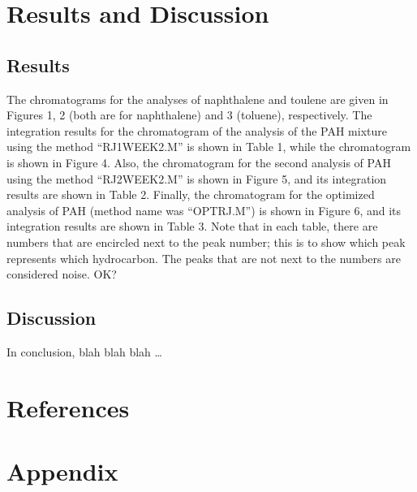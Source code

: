 \documentclass[a4paper, 12pt]{article}
\begin{document}

\section{Results and Discussion}

\subsection{Results}
The chromatograms for the analyses of naphthalene and toulene are given in Figures 1, 2 (both are for naphthalene) and 3 (toluene), respectively. The integration results for the chromatogram of the analysis of the PAH mixture using the method ``RJ1WEEK2.M'' is shown in Table 1, while the chromatogram is shown in Figure 4. Also, the chromatogram for the second analysis of PAH using the method ``RJ2WEEK2.M'' is shown in Figure 5, and its integration results are shown in Table 2. Finally, the chromatogram for the optimized analysis of PAH (method name was ``OPTRJ.M'') is shown in Figure 6, and its integration results are shown in Table 3. Note that in each table, there are numbers that are encircled next to the peak number; this is to show which peak represents which hydrocarbon. The peaks that are not next to the numbers are considered noise. OK?

\subsection{Discussion}

In conclusion, blah blah blah \ldots


\section{References}
\printbibliography


\section{Appendix}
\end{document}
